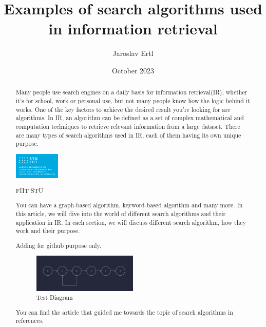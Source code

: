 \documentclass[10pt,twocolumn,twoside,slovak,a4paper]{article}
\title{\textbf{Examples of search algorithms used in information retrieval}}
\author{Jaroslav Ertl}
\date{October 2023}
\begin{document}
\maketitle
 
\begin{abstract}
    Many people use search engines on a daily basis for information retrieval(IR), whether it's for school, work or personal use, but not many people know how the logic behind it works. One of the key factors to achieve the desired result you're looking for are algorithms. In IR, an algorithm can be defined as a set of complex mathematical and computation techniques to retrieve relevant information from a large dataset. There are many types of search algorithms used in IR, each of them having its own unique purpose. 

\begin{floatingfigure}[r]{0.3\textwidth}
    \centering
  \includegraphics[width=0.18\textwidth]{StuFiit.png} %
  \caption{FIIT STU}
\end{floatingfigure}
  You can have a graph-based algorithm, keyword-based algorithm and many more. In this article, we will dive into the world of different search algorithms and their application in IR. In each section, we will discuss different search algorithm, how they work and their purpose.
    
    Adding for github purpose only.
 \begin{figure}
 \centering
\includegraphics[width=0.5\textwidth]{UmletDiagram.png} %
\caption{Test Diagram}
\end{figure}
You can find the article that guided me towards the topic of search algorithms in references.\cite{10210566}
\end{abstract}


 
\cite{Chonyy}
\end{document}
